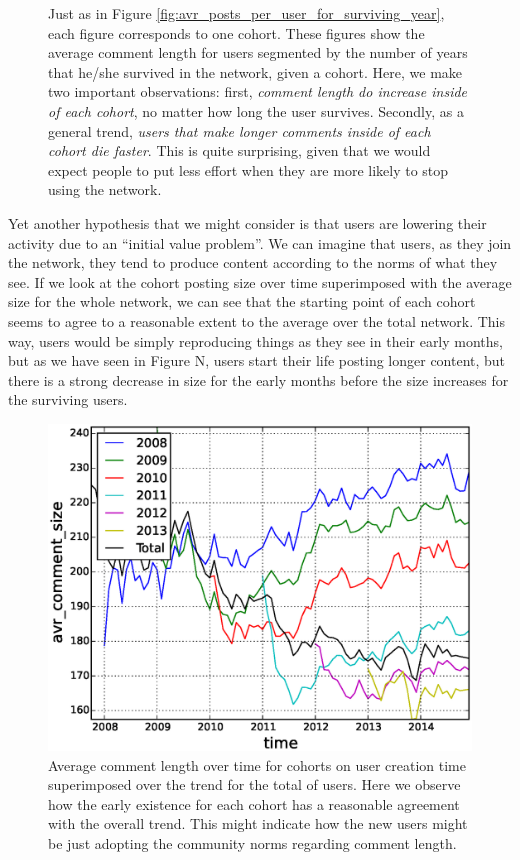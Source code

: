 \begin{figure}[!tb]
\caption{Just as in Figure \ref{fig:avr_posts_per_user_for_surviving_year}, each figure corresponds to one cohort. These figures show the average comment length for users segmented by the number of years that he/she survived in the network, given a cohort. Here, we make two important observations: first, \textit{comment length do increase inside of each cohort}, no matter how long the user survives. Secondly, as a general trend, \textit{users that make longer comments inside of each cohort die faster}. This is quite surprising, given that we would expect people to put less effort when they are more likely to stop using the network.}
\label{fig:avr_comment_length_for_surviving_year}
\end{figure}

Yet another hypothesis that we might consider is that users are lowering their activity due to an ``initial value problem''. We can imagine that users, as they join the network, they tend to produce content according to the norms of what they see. If we look at the cohort posting size over time superimposed with the average size for the whole network, we can see that the starting point of each cohort seems to agree to a reasonable extent to the average over the total network. This way, users would be simply reproducing things as they see in their early months, but as we have seen in Figure N, users start their life posting longer content, but there is a strong decrease in size for the early months before the size increases for the surviving users.

\begin{figure}[!tb]
\centering
\includegraphics[scale=0.4]{./images/avr_comment_size_over_time_cohorts.eps}
\caption{Average comment length over time for cohorts on user creation time superimposed over the trend for the total of users. Here we observe how the early existence for each cohort has a reasonable agreement with the overall trend. This might indicate how the new users might be just adopting the community norms regarding comment length.}
\label{fig:fig_label}
\end{figure}

